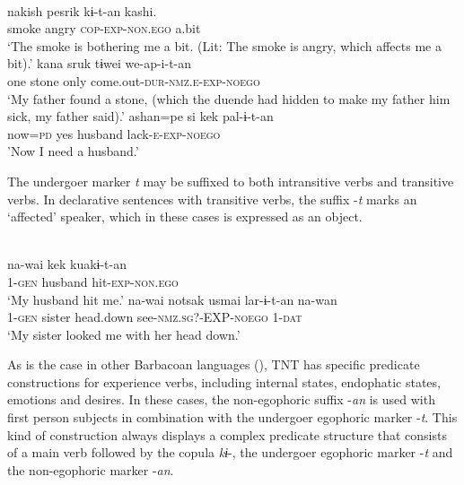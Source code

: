 \documentclass[output=paper]{langsci/langscibook}
\begin{document}
\ea
{}\\ 
	\ea \label{ex:gg65a}
    \gll nakish	pesrik	kɨ-t-an	kashi.\\
         smoke	angry \textsc{cop-exp-non.ego} a.bit\\
    \glt ‘The smoke is bothering me a bit. (Lit: The smoke is angry, which affects me a bit).’
  \ex \label{ex:gg65b}
    \gll kana	sruk	tɨwei	we-ap-i-t-an\\
   	one	stone only come.out-\textsc{dur-nmz.e-exp-noego}\\    
   	\glt ‘My father found a stone, (which the duende had hidden to make my father him sick, my father said).’
   \ex \label{ex:gg65c}
   \gll ashan=pe	si	kek	pal-ɨ-t-an\\
   now=\textsc{pd} yes	husband	lack-\textsc{e-exp-noego}\\
   \glt 'Now I need a husband.'
\z \z

The undergoer marker \textit{t} may be suffixed to both intransitive verbs and transitive verbs. In declarative sentences with transitive verbs, the suffix -\textit{t} marks an ‘affected’ speaker, which in these cases is expressed as an object.

\ea
{}\\ 
	\ea \label{ex:gg66a}
    \gll na-wai	kek	kuakɨ-t-an\\
         1-\textsc{gen}	husband	hit-\textsc{exp-non.ego}\\
    \glt ‘‎‎My husband hit me.’
  \ex \label{ex:gg66b}
    \gll na-wai	notsak	usmai	lar-ɨ-t-an	na-wan\\
         1-\textsc{gen}	sister	head.down	see-\textsc{nmz.sg?-EXP-noego}	1-\textsc{dat}\\    
   	\glt ‘My sister looked me with her head down.’
\z \z

As is the case in other Barbacoan languages (\citealt[25]{Floyd2018}), TNT has specific predicate constructions for experience verbs, including internal states, endophatic states, emotions and desires. In these cases, the non-egophoric suffix -\textit{an} is used with first person subjects in combination with the undergoer egophoric marker -\textit{t}. This kind of construction always displays a complex predicate structure that consists of a main verb followed by the copula \textit{kɨ}-, the undergoer egophoric marker -\textit{t} and the non-egophoric marker -\textit{an}.
\end{document}

